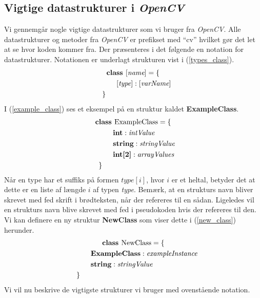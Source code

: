{\subsection{Vigtige datastrukturer i \emph{OpenCV}}
Vi gennemgår nogle vigtige datastrukturer som vi bruger fra
\emph{OpenCV}.  Alle datastrukturer og metoder fra \emph{OpenCV} er
prefikset med ``cv'' hvilket gør det let at se hvor koden kommer fra.
Der præsenteres i det følgende en notation for datastrukturer.
Notationen er underlagt strukturen vist i
(\ref{types_class}).
\begin{multline}
    \textbf{class~} [\textit{name}] = \{ \\
    \shoveleft{\qquad[\textit{type}] : [\textit{varName}]} \\
    \shoveleft{\}}\shoveright{}
    \label{types_class}
\end{multline}
I (\ref{example_class}) ses et eksempel på en struktur kaldet
\textbf{ExampleClass}.
\begin{multline}
    \textbf{class~} \textrm{ExampleClass} = \{ \\
    \shoveleft{\qquad\textbf{int} : \textit{intValue}} \\
    \shoveleft{\qquad\textbf{string} : \textit{stringValue}} \\
    \shoveleft{\qquad\textbf{int[2]} : \textit{arrayValues}} \\
    \shoveleft{\}}\shoveright{}
    \label{example_class}
\end{multline}
Når en type har et suffiks på formen $\textit{type}[i]$, hvor $i$ er et
heltal, betyder det at dette er en liste af længde $i$ af typen
\textit{type}.  Bemærk, at en strukturs navn bliver skrevet med fed
skrift i brødteksten, når der refereres til en sådan. Ligeledes vil en
strukturs navn blive skrevet med fed i pseudokoden hvis der refereres
til den. Vi kan definere en ny struktur \textbf{NewClass} som viser
dette i (\ref{new_class}) herunder.
\begin{multline}
    \textbf{class~} \textrm{NewClass} = \{ \\
    \shoveleft{\qquad\textbf{ExampleClass} : \textit{exampleInstance}} \\
    \shoveleft{\qquad\textbf{string} : \textit{stringValue}} \\
    \shoveleft{\}}\shoveright{}
    \label{new_class}
\end{multline}
Vi vil nu beskrive de vigtigste strukturer vi bruger med ovenstående
notation.

}
